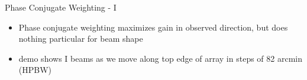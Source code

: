 \documentclass[pdf,azure,slideColor,colorBG]{prosper}
\begin{document}

\begin{slide}{Phase Conjugate Weighting - I}
\begin{small}
\begin{itemize}
\item Phase conjugate weighting maximizes gain in observed
direction, but does nothing particular for beam shape
\item demo shows I beams as we move along top edge of array in steps of 82 arcmin (HPBW)
\end{itemize}
\end {small}
{\centering
{}
}
\end{slide}
\end{document}
